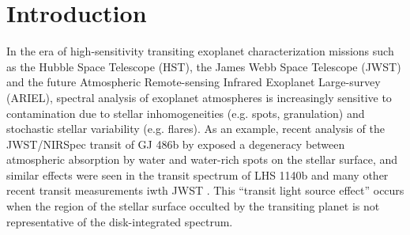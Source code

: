 \documentclass[twocolumn]{aastex631}
\newcommand{\vspec}[1]{\texttt{VSPEC}#1}
\begin{document}
\author{Geronimo L. Villanueva}

\begin{abstract}
    We present the Variable Star PhasE Curve (VSPEC) Collection, a set of Python packages for simulating combined-light spectroscopic observations of 3-dimensional exoplanet atmospheres in the presence of stellar variability and inhomogeneity. \vspec{} uses the Planetary Spectrum Generator's Global Emission Spectra (PSG/GlobES) application along with a custom-built multi-component time-variable stellar model based on an user-defined grid of stellar photosphere models to produce spectroscopic light curves of the planet-host system. \vspec{} can be a useful tool for modeling observations of exoplanets in transiting geometries (primary transit, secondary eclipse) as well as orbital phase curve measurements, and is built in a modular and flexible configuration for easy adaptability to new stellar and planetary model inputs. We additionally present a set of codes developed alongside the core \vspec{} modules, including the stellar surface model generator \texttt{vspec-vsm}, the stellar spectral grid interpolation code GridPolator, and a Python interface for PSG \texttt{pypsg}.
\end{abstract}


\section{Introduction}
\label{sec:intro}

In the era of high-sensitivity transiting exoplanet characterization missions such as the Hubble Space Telescope (HST), the James Webb Space Telescope (JWST) and the future Atmospheric Remote-sensing Infrared Exoplanet Large-survey (ARIEL), spectral analysis of exoplanet atmospheres is increasingly sensitive to contamination due to stellar inhomogeneities (e.g. spots, granulation) and stochastic stellar variability (e.g. flares).  As an example, recent analysis of the JWST/NIRSpec transit of GJ 486b by \citet{moran2023} exposed a degeneracy between atmospheric absorption by water and water-rich spots on the stellar surface, and similar effects were seen in the transit spectrum of LHS 1140b \citep{cadieux2024} and many other recent transit measurements iwth JWST \citep[e.g.,][]{lim2023,may2023,fournier-tondreau2024}. This ``transit light source effect'' \citep[TLS,][see also \citet{apai2018,barclay2021,garcia2022,barclay2023}]{rackham2018} occurs when the region of the stellar surface occulted by the transiting planet is not representative of the disk-integrated spectrum.
\end{document}
